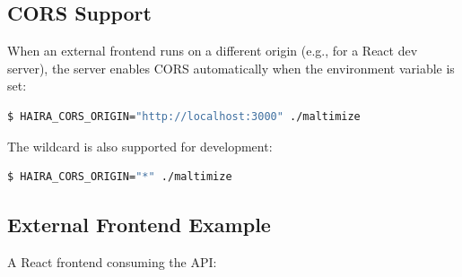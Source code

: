 \subsection{CORS Support}

When an external frontend runs on a different origin (e.g.,  for a React dev server), the \haira{} server enables CORS automatically when the  environment variable is set:

\begin{lstlisting}[language=bash,numbers=none]
$ HAIRA_CORS_ORIGIN="http://localhost:3000" ./maltimize
\end{lstlisting}

The wildcard \code{*} is also supported for development:

\begin{lstlisting}[language=bash,numbers=none]
$ HAIRA_CORS_ORIGIN="*" ./maltimize
\end{lstlisting}

\subsection{External Frontend Example}

A React frontend consuming the \haira{} API:

